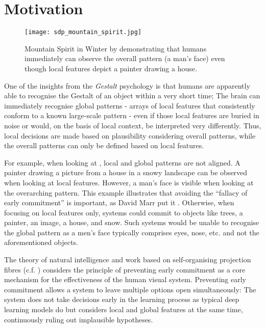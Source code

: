 \section{Motivation}
\begin{figure}[h]
    \centering
    \texttt{[image: sdp\_mountain\_spirit.jpg]}
    \caption[Mountain Spirit in Winter by Sandro del Prete]{Mountain Spirit in Winter by  demonstrating that humans immediately can observe the overall pattern (a man's face) even though local features depict a painter drawing a house.}
\end{figure}

One of the insights from the \emph{Gestalt} psychology  is that humans are apparently able to recognise the Gestalt of an object within a very short time; The brain can immediately recognise global patterns - arrays of local features that consistently conform to a known large-scale pattern - even if those local features are buried in noise or would, on the basis of local context, be interpreted very differently. Thus, local decisions are made based on plausibility considering overall patterns, while the overall patterns can only be defined based on local features.

For example, when looking at , local and global patterns are not aligned. A painter drawing a picture from a house in a snowy landscape can be observed when looking at local features. However, a man's face is visible when looking at the overarching pattern.
This example illustrates that avoiding the ``fallacy of early commitment'' is important, as David Marr put it .
Otherwise, when focusing on local features only, systems could commit to objects like trees, a painter, an image, a house, and snow. Such systems would be unable to recognise the global pattern as a men's face typically comprises eyes, nose, etc. and not the aforementioned objects.

The theory of natural intelligence  and work based on self-organising projection fibres (c.f. ) considers the principle of preventing early commitment as a core mechanism for the effectiveness of the human visual system.
Preventing early commitment allows a system to leave multiple options open simultaneously: The system does not take decisions early in the learning process as typical deep learning models do but considers local and global features at the same time, continuously ruling out implausible hypotheses.

